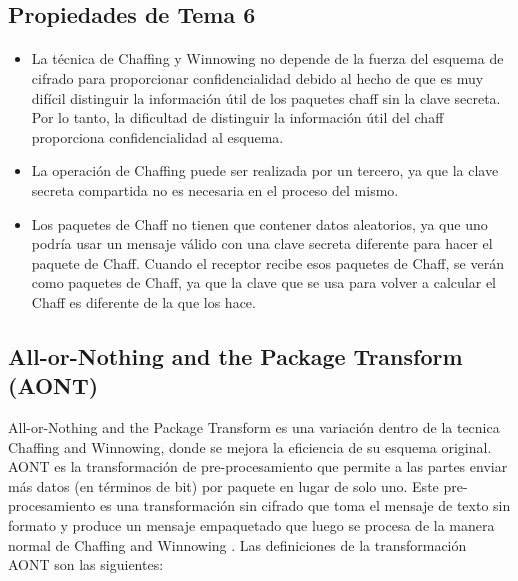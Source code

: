 \documentclass[12pt, a4paper, titlepage]{report}
\begin{document}
        \subsection{Propiedades de Tema 6}
        
        \paragraph{}
        \begin{itemize}
		    \item La técnica de Chaffing y Winnowing no depende de la fuerza del esquema de cifrado para proporcionar confidencialidad debido al hecho de que es muy difícil distinguir la informaci\'on \'util de los paquetes chaff sin la clave secreta. Por lo tanto, la dificultad de distinguir la informaci\'on \'util del chaff proporciona confidencialidad al esquema.
		    \item La operación de Chaffing puede ser realizada por un tercero, ya que la clave secreta compartida no es necesaria en el proceso del mismo.
		    \item Los paquetes de Chaff no tienen que contener datos aleatorios, ya que uno podría usar un mensaje válido con una clave secreta diferente para hacer el paquete de Chaff. Cuando el receptor recibe esos paquetes de Chaff, se verán como paquetes de Chaff, ya que la clave que se usa para volver a calcular el Chaff es diferente de la que los hace.
		\end{itemize}
		
		\subsection{All-or-Nothing and the Package Transform (AONT)}
        
        All-or-Nothing and the Package Transform es una variación dentro de la tecnica Chaffing and Winnowing, donde se mejora la eficiencia de su esquema original. AONT es la transformación de pre-procesamiento que permite a las partes enviar más datos (en términos de bit) por paquete en lugar de solo uno. Este pre-procesamiento es una transformación sin cifrado que toma el mensaje de texto sin formato y produce un mensaje empaquetado que luego se procesa de la manera normal de Chaffing and Winnowing \cite{refAONT}. Las definiciones de la transformación AONT son las siguientes:
        
\end{document}
